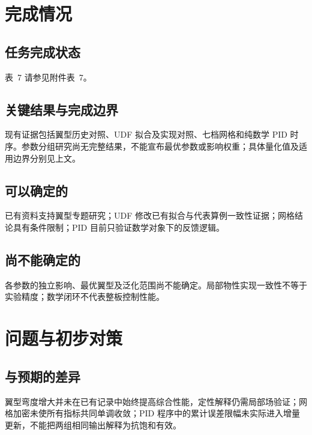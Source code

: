 \documentclass[stage2,fontset=fandol]{ydzjreport}
\makeatletter
\newcommand{\submissionnumber}[1]{\def\@currentlabel{#1}}
\makeatother
\begin{document}
\section{完成情况}

\subsection{任务完成状态}


\par\noindent \begingroup\submissionnumber{7}\label{tab:tasks}\endgroup 表~7 请参见附件表~7。\par


\subsection{关键结果与完成边界}

现有证据包括翼型历史对照、UDF 拟合及实现对照、七档网格和纯数学 PID 时序。参数分组研究尚无完整结果，不能宣布最优参数或影响权重；具体量化值及适用边界分别见上文。



\subsection{可以确定的}

已有资料支持翼型专题研究；UDF 修改已有拟合与代表算例一致性证据；网格结论具有条件限制；PID 目前只验证数学对象下的反馈逻辑。

\subsection{尚不能确定的}

各参数的独立影响、最优翼型及泛化范围尚不能确定。局部物性实现一致性不等于实验精度；数学闭环不代表整板控制性能。

\section{问题与初步对策}

\subsection{与预期的差异}

翼型弯度增大并未在已有记录中始终提高综合性能，定性解释仍需局部场验证；网格加密未使所有指标共同单调收敛；PID 程序中的累计误差限幅未实际进入增量更新，不能把两组相同输出解释为抗饱和有效。
\end{document}
